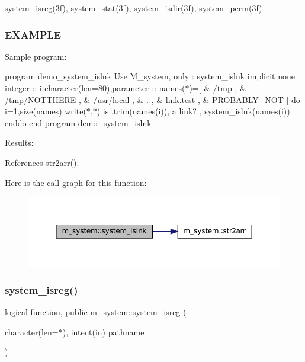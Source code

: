 system\+\_\+isreg(3f), system\+\_\+stat(3f), system\+\_\+isdir(3f), system\+\_\+perm(3f)

\subsubsection*{E\+X\+A\+M\+P\+LE}

Sample program\+:

program demo\+\_\+system\+\_\+islnk Use M\+\_\+system, only \+: system\+\_\+islnk implicit none integer \+:\+: i character(len=80),parameter \+:\+: names($\ast$)=\mbox{[} \& \textquotesingle{}/tmp \textquotesingle{}, \& \textquotesingle{}/tmp/\+N\+O\+T\+T\+H\+E\+RE \textquotesingle{}, \& \textquotesingle{}/usr/local \textquotesingle{}, \& \textquotesingle{}. \textquotesingle{}, \& \textquotesingle{}link.\+test \textquotesingle{}, \& \textquotesingle{}P\+R\+O\+B\+A\+B\+L\+Y\+\_\+\+N\+OT \textquotesingle{}\mbox{]} do i=1,size(names) write($\ast$,$\ast$)\textquotesingle{} is \textquotesingle{},trim(names(i)),\textquotesingle{} a link? \textquotesingle{}, system\+\_\+islnk(names(i)) enddo end program demo\+\_\+system\+\_\+islnk

Results\+: 

References str2arr().

Here is the call graph for this function\+:
\nopagebreak
\begin{figure}[H]
\begin{center}
\leavevmode
\includegraphics[width=350pt]{namespacem__system_ab05694cc3d76a3ecc87e4b4490c4c217_cgraph}
\end{center}
\end{figure}
\mbox{\label{namespacem__system_a127bdd84ccd4b52f3f29abbc56af029b}} 
\subsubsection{\texorpdfstring{system\+\_\+isreg()}{system\_isreg()}}
{\footnotesize\ttfamily logical function, public m\+\_\+system\+::system\+\_\+isreg (\begin{DoxyParamCaption}\item[{character(len=$\ast$), intent(in)}]{pathname }\end{DoxyParamCaption})}



